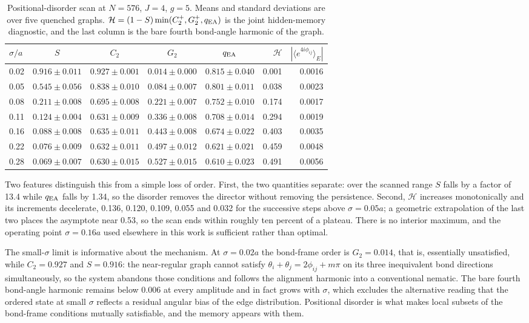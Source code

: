 \documentclass[aps,prl,onecolumn,superscriptaddress,nofootinbib]{revtex4-2}
\begin{document}
\begin{table}[ht]
\centering
\caption{Positional-disorder scan at \(N=576\), \(J=4\), \(g=5\).  Means and
standard deviations are over five quenched graphs.  \(\mathcal H=(1-S)
\min(C_2^+,G_2^+,q_{\rm EA})\) is the joint hidden-memory diagnostic, and the
last column is the bare fourth bond-angle harmonic of the graph.}
\label{tab:supp-disorder}
\begin{ruledtabular}
\begin{tabular}{lccccrr}
\(\sigma/a\)&\(S\)&\(C_2\)&\(G_2\)&\(q_{\rm EA}\)&\(\mathcal H\)&
\(\left|\langle e^{4i\phi_{ij}}\rangle_E\right|\)\\
\hline
0.02&\(0.916\pm0.011\)&\(0.927\pm0.001\)&\(0.014\pm0.000\)&\(0.815\pm0.040\)&0.001&0.0016\\
0.05&\(0.545\pm0.056\)&\(0.838\pm0.010\)&\(0.084\pm0.007\)&\(0.801\pm0.011\)&0.038&0.0023\\
0.08&\(0.211\pm0.008\)&\(0.695\pm0.008\)&\(0.221\pm0.007\)&\(0.752\pm0.010\)&0.174&0.0017\\
0.11&\(0.124\pm0.004\)&\(0.631\pm0.009\)&\(0.336\pm0.008\)&\(0.708\pm0.014\)&0.294&0.0019\\
0.16&\(0.088\pm0.008\)&\(0.635\pm0.011\)&\(0.443\pm0.008\)&\(0.674\pm0.022\)&0.403&0.0035\\
0.22&\(0.076\pm0.009\)&\(0.632\pm0.011\)&\(0.497\pm0.012\)&\(0.621\pm0.021\)&0.459&0.0048\\
0.28&\(0.069\pm0.007\)&\(0.630\pm0.015\)&\(0.527\pm0.015\)&\(0.610\pm0.023\)&0.491&0.0056\\
\end{tabular}
\end{ruledtabular}
\end{table}

Two features distinguish this from a simple loss of order.  First, the two
quantities separate: over the scanned range \(S\) falls by a factor of 13.4
while \(q_{\rm EA}\) falls by 1.34, so the disorder removes the director
without removing the persistence.  Second, \(\mathcal H\) increases
monotonically and its increments decelerate, 0.136, 0.120, 0.109, 0.055 and
0.032 for the successive steps above \(\sigma=0.05a\); a geometric
extrapolation of the last two places the asymptote near 0.53, so the scan
ends within roughly ten percent of a plateau.  There is no interior maximum,
and the operating point \(\sigma=0.16a\) used elsewhere in this work is
sufficient rather than optimal.

The small-\(\sigma\) limit is informative about the mechanism.  At
\(\sigma=0.02a\) the bond-frame order is \(G_2=0.014\), that is, essentially
unsatisfied, while \(C_2=0.927\) and \(S=0.916\): the near-regular graph
cannot satisfy \(\theta_i+\theta_j=2\phi_{ij}+m\pi\) on its three
inequivalent bond directions simultaneously, so the system abandons those
conditions and follows the alignment harmonic into a conventional nematic.
The bare fourth bond-angle harmonic remains below 0.006 at every amplitude
and in fact grows with \(\sigma\), which excludes the alternative reading
that the ordered state at small \(\sigma\) reflects a residual angular bias
of the edge distribution.  Positional disorder is what makes local subsets of
the bond-frame conditions mutually satisfiable, and the memory appears with
them.
\end{document}
